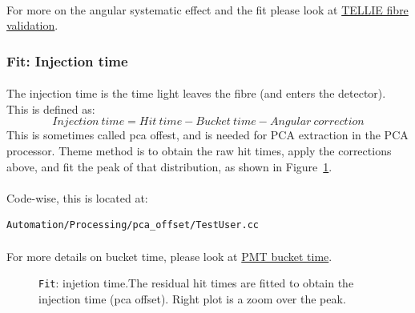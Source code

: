 \documentclass[12pt]{article}
\begin{document}
\paragraph{}
For more on the angular systematic effect and the fit please look at \href{http://users.sussex.ac.uk/~mr514/TELLIE_angular_systematic.pdf}{TELLIE fibre validation}.

\subsubsection{Fit: Injection time}\label{subsub:inj}
\paragraph{}
The injection time is the time light leaves the fibre (and enters the detector). This is defined as:
$$ Injection\:time = Hit\:time - Bucket\:time - Angular\:correction $$
This is sometimes called pca offest, and is needed for PCA extraction in the PCA processor. Theme method is to obtain the raw hit times, apply the corrections above, and fit the peak of that distribution, as shown in Figure~\ref{fig:inj}.

\paragraph{}
Code-wise, this is located at:
\begin{lstlisting}
Automation/Processing/pca_offset/TestUser.cc
\end{lstlisting}

\paragraph{}
For more details on bucket time, please look at \href{https://www.snolab.ca/snoplus/private/DocDB/cgi/ShowDocument?docid=3138&version=5}{PMT bucket time}.

\begin{figure}
\centering
\noindent{}
  \caption{\centering \texttt{Fit}: injetion time.\hspace{\textwidth}The residual hit times are fitted to obtain the injection time (pca offset). Right plot is a zoom over the peak.}
  \label{fig:inj}
\end{figure}
\end{document}

